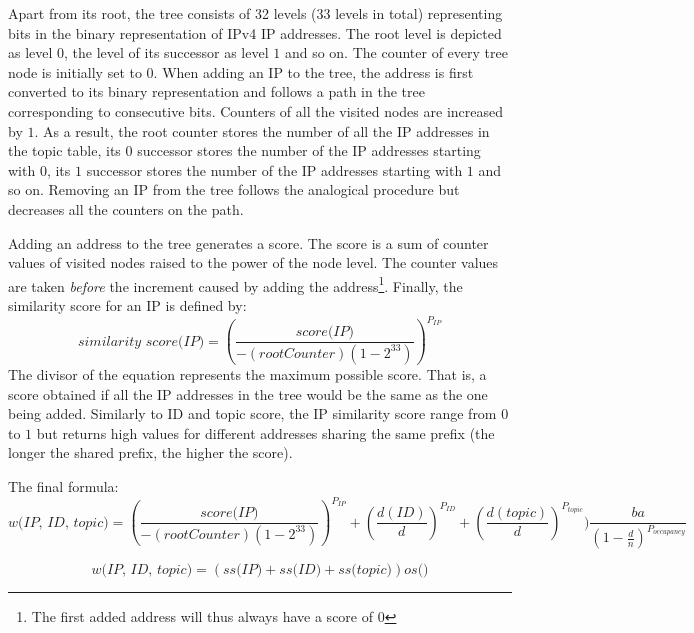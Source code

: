 Apart from its root, the tree consists of 32 levels (33 levels in total) representing bits in the binary representation of IPv4 IP addresses. The root level is depicted as level $0$, the level of its successor as level $1$ and so on. The counter of every tree node is initially set to $0$. When adding an IP to the tree, the address is first converted to its binary representation and follows a path in the tree corresponding to consecutive bits. Counters of all the visited nodes are increased by $1$. As a result, the root counter stores the number of all the IP addresses in the topic table, its $0$ successor stores the number of the IP addresses starting with $0$, its $1$ successor stores the number of the IP addresses starting with $1$ and so on. Removing an IP from the tree follows the analogical procedure but decreases all the counters on the path. 

Adding an address to the tree generates a score. The score is a sum of counter values of visited nodes raised to the power of the node level. 
 The counter values are taken \emph{before} the increment caused by adding the address\footnote{The first added address will thus always have a score of $0$}. Finally, the similarity score for an IP is defined by:
\begin{equation}
    \textit{similarity score(IP}) = (\frac{\textit{score(IP)}}{-(\textit{rootCounter})(1 - 2^{33})})^{P_\textit{IP}}
\end{equation}
The divisor of the equation represents the maximum possible score. That is, a score obtained if all the IP addresses in the tree would be the same as the one being added. Similarly to ID and topic score, the IP similarity score range from $0$ to $1$ but returns high values for different addresses sharing the same prefix (the longer the shared prefix, the higher the score).

The final formula:
\begin{equation}
    \textit{w(IP, ID, topic)} = 
    (\frac{\textit{score(IP)}}{-(\textit{rootCounter})(1 - 2^{33})})^{P_\textit{IP}} +
    (\frac{d(ID)}{d})^{P_{ID}} +
    (\frac{d(topic)}{d})^{P_{topic}})
    \frac{ba}{(1-\frac{d}{n})^{P_{occupancy}}}
\end{equation}

\begin{equation}
    \textit{w(IP, ID, topic)} = 
    (\textit{ss(IP)} + 
    \textit{ss(ID)} + 
    \textit{ss(topic)})
    \textit{os()}
\end{equation}

